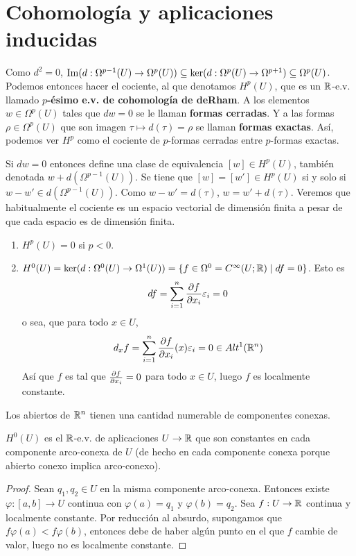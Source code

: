 \documentclass[CV.tex]{subfiles}
\begin{document}
\section{Cohomología y aplicaciones inducidas}


Como $d^2=0$, $\operatorname{Im}(d:\Omega^{p-1}(U)\to\Omega^p(U))\subseteq\ker(d:\Omega^p(U)\to\Omega^{p+1})\subseteq\Omega^p(U)$. Podemos entonces hacer el cociente, al que denotamos $H^p(U)$, que es un $\mathbb{R}$-e.v. llamado \textbf{$p$-ésimo e.v. de cohomología de deRham}. A los elementos $w\in\Omega^p(U)$ tales que $dw=0$ se le llaman \textbf{formas cerradas}. Y a las formas $\rho\in\Omega^p(U)$ que son imagen $\tau\mapsto d(\tau)=\rho$ se llaman \textbf{formas exactas}. Así, podemos ver $H^p$ como el cociente de $p$-formas cerradas entre $p$-formas exactas. 

Si $dw=0$ entonces define una clase de equivalencia $[w]\in H^p(U)$, también denotada $w+d(\Omega^{p-1}(U))$. Se tiene que $[w]=[w']\in H^p(U)$ si y solo si $w-w'\in d(\Omega^{p-1}(U))$. Como $w-w'=d(\tau)$, $w=w'+d(\tau)$. Veremos que habitualmente el cociente es un espacio vectorial de dimensión finita a pesar de que cada espacio es de dimensión finita. 

\begin{ej}
\begin{enumerate}
\item $H^p(U)=0$ si $p<0$.
\item $H^0(U)=\ker(d:\Omega^0(U)\to\Omega^1(U))=\{f\in\Omega^0=C^{\infty}(U;\mathbb{R})\mid df=0\}$. Esto es
\[
df=\sum_{i=1}^n\frac{\partial f}{\partial x_i}\varepsilon_i=0
\]
o sea, que para todo $x\in U$,
\[
d_xf=\sum_{i=1}^n\frac{\partial f}{\partial x_i}(x)\varepsilon_i=0\in Alt^1(\mathbb{R}^n)
\]
Así que $f$ es tal que $\frac{\partial f}{\partial x_i}=0$ para todo $x\in U$, luego $f$ es localmente constante.
\end{enumerate}
\end{ej}

\begin{nota}
Los abiertos de $\mathbb{R}^n$ tienen una cantidad numerable de componentes conexas. 
\end{nota}


\begin{lemma}
$H^0(U)$ es el $\mathbb{R}$-e.v. de aplicaciones $U\to\mathbb{R}$ que son constantes en cada componente arco-conexa de $U$ (de hecho en cada componente conexa porque abierto conexo implica arco-conexo). 
\end{lemma}
\begin{proof}
Sean $q_1,q_2\in U$ en la misma componente arco-conexa. Entonces existe $\varphi:[a,b]\to U$ continua con $\varphi(a)=q_1$ y $\varphi(b)=q_2$. Sea $f:U\to \mathbb{R}$ continua y localmente constante. Por reducción al absurdo, supongamos que $f\varphi(a)<f\varphi(b)$, entonces debe de haber algún punto en el que $f$ cambie de valor, luego no es localmente constante.
\end{proof}
\end{document}
